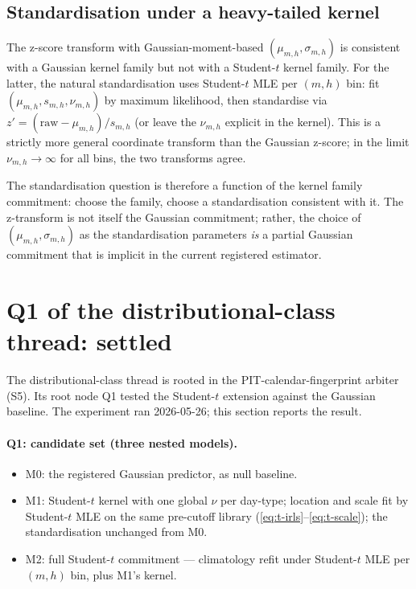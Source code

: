 \documentclass[11pt]{article}
\theoremstyle{definition}
\theoremstyle{plain}
\begin{document}
\subsection{Standardisation under a heavy-tailed kernel}
\label{sec:nongauss-std}

The z-score transform with Gaussian-moment-based
$(\mu_{m,h}, \sigma_{m,h})$ is consistent with a Gaussian kernel
family but not with a Student-$t$ kernel family. For the latter,
the natural standardisation uses Student-$t$ MLE per $(m, h)$ bin:
fit $(\mu_{m,h}, s_{m,h}, \nu_{m,h})$ by maximum likelihood, then
standardise via $z' = (\mathrm{raw} - \mu_{m,h}) / s_{m,h}$ (or
leave the $\nu_{m,h}$ explicit in the kernel). This is a strictly
more general coordinate transform than the Gaussian z-score; in
the limit $\nu_{m,h} \to \infty$ for all bins, the two transforms
agree.

The standardisation question is therefore a function of the kernel
family commitment: choose the family, choose a standardisation
consistent with it. The z-transform is not itself the Gaussian
commitment; rather, the choice of $(\mu_{m,h}, \sigma_{m,h})$ as
the standardisation parameters \emph{is} a partial Gaussian
commitment that is implicit in the current registered estimator.

\section{Q1 of the distributional-class thread: settled}
\label{sec:q1-settled}

The distributional-class thread is rooted in the PIT-calendar-fingerprint
arbiter (S5). Its root node Q1 tested the Student-$t$ extension
against the Gaussian baseline. The experiment ran 2026-05-26; this
section reports the result.

\paragraph{Q1: candidate set (three nested models).}
\begin{itemize}[leftmargin=2em]
\item M0: the registered Gaussian predictor, as null baseline.
\item M1: Student-$t$ kernel with one global $\nu$ per day-type;
location and scale fit by Student-$t$ MLE on the same pre-cutoff
library (\eqref{eq:t-irls}--\eqref{eq:t-scale}); the standardisation
unchanged from M0.
\item M2: full Student-$t$ commitment --- climatology refit under
Student-$t$ MLE per $(m, h)$ bin, plus M1's kernel.
\end{itemize}
\end{document}
